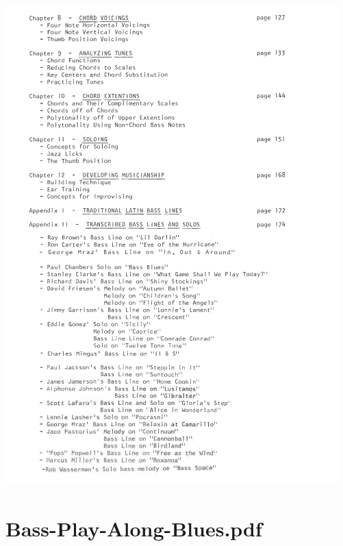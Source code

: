 \documentclass[a4paper]{book}
\begin{document}
\begin{center}
\includegraphics[width=12.831cm,height=18.517cm]{lebluessupportsmethodes-img149.png}
\end{center}
\clearpage\section[Bass{}-Play{}-Along{}-Blues.pdf]{Bass-Play-Along-Blues.pdf}
\end{document}
